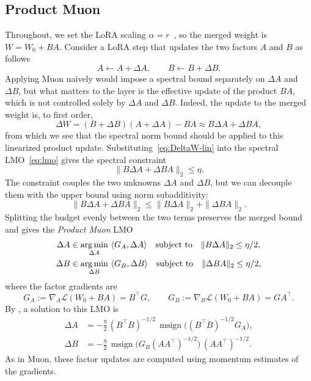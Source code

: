 \documentclass[11pt]{article}
\DeclareMathOperator*{\argmin}{arg\,min}
\newcommand{\ip}[1]{\langle #1 \rangle}
\DeclareMathOperator{\msign}{msign}          %
\newcommand{\norm}[1]{\| #1\|}
\theoremstyle{plain}
\theoremstyle{definition}
\theoremstyle{remark}
\theoremstyle{definition}
\begin{document}
\subsection{Product Muon}\label{sec:product-muon}
Throughout, we set the LoRA scaling $\alpha=r$~\cite{loralearnsless, raschka}, so the merged weight is $W = W_0 + BA$. Consider a LoRA step that updates the two factors $A$ and $B$ as follows
\[
A \leftarrow A + \Delta A,
\qquad
B \leftarrow B + \Delta B.
\]
Applying Muon naively would impose a spectral bound separately on $\Delta A$ and $\Delta B$, but what matters to the layer is the effective update of the product $BA$, which is not controlled solely by $\Delta A$ and $\Delta B$. Indeed, the update to the merged weight is, to first order,
\begin{equation} \label{eq:DeltaW-lin}
\Delta W = (B + \Delta B)(A + \Delta A) - BA \approx B \Delta A + \Delta B A,
\end{equation}
from which we see that the spectral norm bound should be applied to this linearized product update. Substituting~\eqref{eq:DeltaW-lin} into the spectral LMO~\eqref{eq:lmo} gives the spectral constraint
\[
\norm{B \Delta A + \Delta B A}_2
\le \eta.
\]
The constraint couples the two unknowns $\Delta A$ and $\Delta B$, but we can decouple them with the upper bound using norm subadditivity:
\[
\norm{B \Delta A + \Delta B A}_2
\le
\norm{B \Delta A}_2 + \norm{\Delta B A}_2.
\]
Splitting the budget evenly between the two terms preserves the merged bound and gives the \emph{Product Muon} LMO
\begin{equation}
  \begin{aligned}
  \Delta A &\in \argmin_{\Delta A}~ \ip{G_A, \Delta A}
  \quad \textnormal{subject to}\quad
  \norm{B \Delta A}_2\le\eta/2, \\
  \Delta B &\in \argmin_{\Delta B}~ \ip{G_B, \Delta B}
  \quad \textnormal{subject to}\quad
  \norm{\Delta B A}_2\le\eta/2,
  \end{aligned}
  \label{eq:decoupled-lora-lmo}
\end{equation}
where the factor gradients are
\begin{equation}\label{e-grad-wrt-factors}
    G_A := \nabla_A \mathcal{L}(W_0+BA) = B^\top G,
    \qquad
    G_B := \nabla_B \mathcal{L}(W_0+BA) = G A^\top.
\end{equation}
By , a solution to this LMO is
\begin{equation}\label{eq:product-muon-step}
\begin{aligned}
    \Delta A &= -\tfrac{\eta}{2}\,(B^\top B)^{-1/2}\,\msign\!\big((B^\top B)^{-1/2} G_A\big), \\
    \Delta B &= -\tfrac{\eta}{2}\,\msign\!\big(G_B (A A^\top)^{-1/2}\big)\,(A A^\top)^{-1/2}.
\end{aligned}
\end{equation}
As in Muon, these factor updates are computed using momentum estimates of the gradients.
\end{document}
